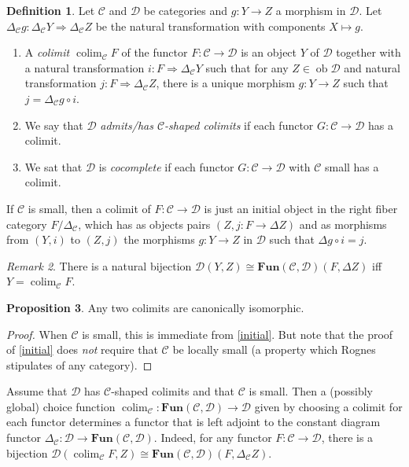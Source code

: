 \documentclass[10pt,letterpaper,cm]{nupset}
\theoremstyle{definition}
\newtheorem{definition}{Definition}[section]
\theoremstyle{theorem}
\newtheorem{prop}[definition]{Proposition}
\theoremstyle{remark}
\newtheorem{remark}[definition]{Remark}
\newcommand{\1}{\mathbf{1}}
\renewcommand{\c}{\mathscr{C}}
\renewcommand{\d}{\mathscr{D}}
\newcommand{\0}{\vec 0}
\DeclareMathOperator{\ob}{ob}
\DeclareMathOperator{\colim}{colim}
\begin{document}
\begin{definition}
Let $\c$ and $\d$ be categories and $g: Y \to Z$ a morphism in $\d$. Let $\Delta_{\c} g : \Delta_{\c} Y \Rightarrow \Delta_{\c} Z$ be the natural transformation with components $X \mapsto g$. 
\begin{enumerate}
\item A \textit{colimit  $\colim_{\c}{F}$} of the functor $F: \c \to \d$ is an object $Y$ of $\d$ together with a natural transformation $i : F \Rightarrow \Delta_{\c} Y$ such that for any $Z \in \ob \d$ and natural transformation $j: F \Rightarrow \Delta_{\c} Z$, there is a unique morphism $g: Y \to Z$ such that $j = \Delta_{\c}g \circ i$.
\item  We say that $\d$ \textit{admits/has  $\c$-shaped colimits} if each functor $G: \c \to \d$ has a colimit.
\item We sat that $\d$ is \textit{cocomplete} if each functor $G : \c \to \d$ with $\c$ small has a colimit.
\end{enumerate}
\end{definition}

If $\c$ is small, then a colimit of $F: \c \to \d$ is just an initial object in the right fiber category $F/\Delta_{\c}$, which has as objects pairs $\left(Z, j: F \to \Delta{Z}\right)$ and as morphisms from $\left(Y, i\right)$ to $\left(Z, j\right)$ the morphisms $g : Y \to Z$ in $\d$ such that $\Delta{g} \circ i = j$.

\smallskip

\begin{remark}
There is a natural bijection $\d(Y, Z) \cong \mathbf{Fun}(\c, \d)(F, \Delta{Z})$ iff $Y = \colim_{\c}F$.
\end{remark}

\begin{prop}
Any two colimits are canonically isomorphic.
\end{prop}
\begin{proof}
When $\c$ is small, this is immediate from \cref{initial}. But note that the proof of \cref{initial} does \emph{not} require that $\c$ be locally small (a property which Rognes stipulates of any category). 
\end{proof}

\smallskip

Assume that $\d$ has $\c$-shaped colimits and that $\c$ is small. Then a (possibly global) choice function $\colim_\c : \mathbf{Fun}(\c, \d) \to \d$ given by choosing a colimit for each functor determines a functor that is left adjoint to the constant diagram functor $\Delta_{\c} : \d \to \mathbf{Fun}(\c, \d)$. Indeed,
for any functor $F : \c \to \d$, there is a bijection $\d(\colim_{\c} F, Z) \cong \mathbf{Fun}(\c, \d)(F, \Delta_{\c}Z)$.
\end{document}
